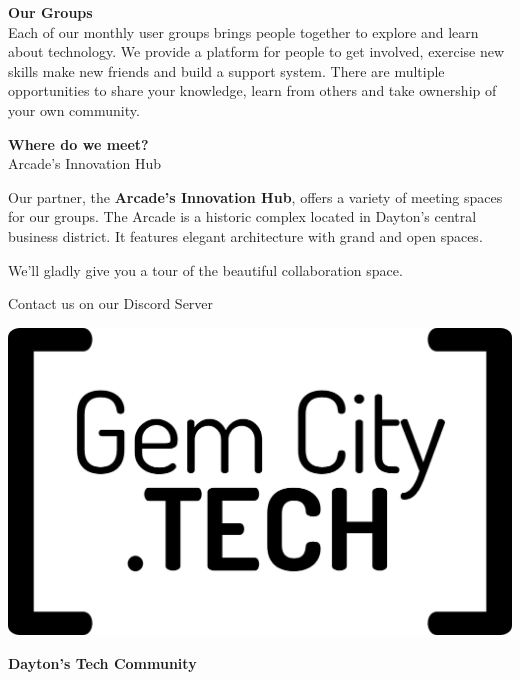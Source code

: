 \documentclass[14pt]{extarticle}
\begin{document}
\begin{multicols}{3}

\columnbreak

\textbf{Our Groups}\\
Each of our monthly user groups brings people together to explore and
learn about technology. We provide a platform for people to get
involved, exercise new skills make new friends and build a support
system. There are multiple opportunities to share your knowledge, learn
from others and take ownership of your own community.

\textbf{Where do we meet?}\\
Arcade's Innovation Hub

Our partner, the \textbf{Arcade’s Innovation Hub}, offers a variety of
meeting spaces for our groups. The Arcade is a historic complex located
in Dayton's central business district. It features elegant architecture
with grand and open spaces.

We'll gladly give you a tour of the beautiful collaboration space.

Contact us on our Discord Server


\columnbreak

\includegraphics{img/GCTSquareWhiteForeground.png}

\textbf{Dayton's Tech Community}


\end{multicols}
\end{document}
